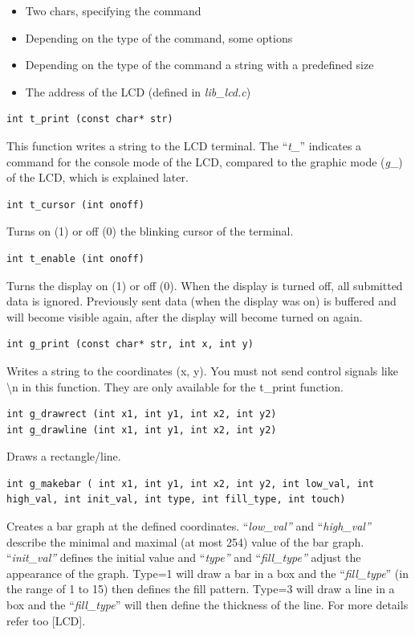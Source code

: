 \begin{itemize}
\item
  Two chars, specifying the command
\item
  Depending on the type of the command, some options
\item
  Depending on the type of the command a string with a predefined size
\item
  The address of the LCD (defined in \emph{lib\_lcd.c})
\end{itemize}
\begin{lstlisting}
int t_print (const char* str)
\end{lstlisting}
This function writes a string to the LCD terminal. The ``\emph{t\_}''
indicates a command for the console mode of the LCD, compared to the
graphic mode (\emph{g\_}) of the LCD, which is explained later.
\begin{lstlisting}
int t_cursor (int onoff)
\end{lstlisting}
Turns on (1) or off (0) the blinking cursor of the terminal.
\begin{lstlisting}
int t_enable (int onoff)
\end{lstlisting}
Turns the display on (1) or off (0). When the display is turned off, all
submitted data is ignored. Previously sent data (when the display was
on) is buffered and will become visible again, after the display will
become turned on again.
\begin{lstlisting}
int g_print (const char* str, int x, int y)
\end{lstlisting}
Writes a string to the coordinates (x, y). You must not send control
signals like \textbackslash n in this function. They are only available
for the t\_print function.
\begin{lstlisting}
int g_drawrect (int x1, int y1, int x2, int y2)
int g_drawline (int x1, int y1, int x2, int y2)	
\end{lstlisting}
Draws a rectangle/line.
\begin{lstlisting}
int g_makebar (	int x1, int y1, int x2, int y2, int low_val, int high_val, int init_val, int type, int fill_type, int touch)
\end{lstlisting}
Creates a bar graph at the defined coordinates. ``\emph{low\_val''} and
``\emph{high\_val''} describe the minimal and maximal (at most 254)
value of the bar graph. ``\emph{init\_val''} defines the initial value
and ``\emph{type''} and ``\emph{fill\_type''} adjust the appearance of
the graph. Type=1 will draw a bar in a box and the ``\emph{fill\_type}''
(in the range of 1 to 15) then defines the fill pattern. Type=3 will
draw a line in a box and the ``\emph{fill\_type}'' will then define the
thickness of the line. For more details refer too {[}LCD{]}.


